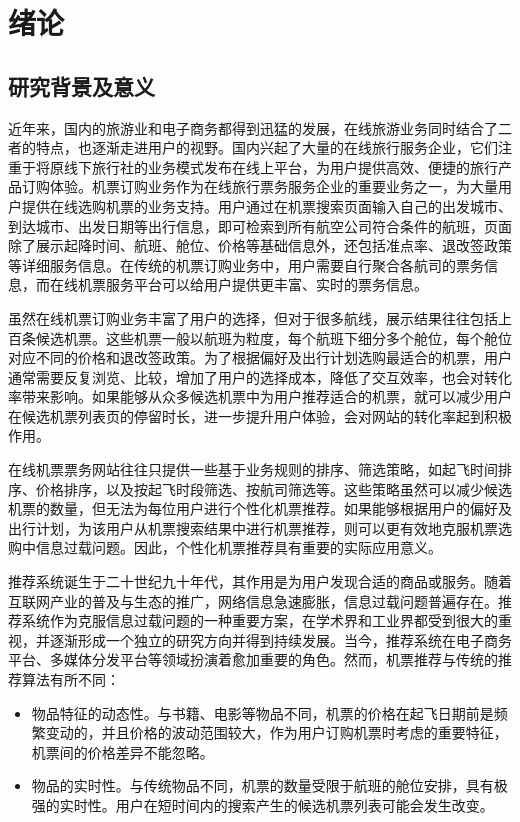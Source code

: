 
\chapter{绪论 }
\label{chap:intro}


\section{研究背景及意义}
近年来，国内的旅游业和电子商务都得到迅猛的发展，在线旅游业务同时结合了二者的特点，也逐渐走进用户的视野。国内兴起了大量的在线旅行服务企业，它们注重于将原线下旅行社的业务模式发布在线上平台，为用户提供高效、便捷的旅行产品订购体验。机票订购业务作为在线旅行票务服务企业的重要业务之一，为大量用户提供在线选购机票的业务支持。用户通过在机票搜索页面输入自己的出发城市、到达城市、出发日期等出行信息，即可检索到所有航空公司符合条件的航班，页面除了展示起降时间、航班、舱位、价格等基础信息外，还包括准点率、退改签政策等详细服务信息。在传统的机票订购业务中，用户需要自行聚合各航司的票务信息，而在线机票服务平台可以给用户提供更丰富、实时的票务信息。

虽然在线机票订购业务丰富了用户的选择，但对于很多航线，展示结果往往包括上百条候选机票。这些机票一般以航班为粒度，每个航班下细分多个舱位，每个舱位对应不同的价格和退改签政策。为了根据偏好及出行计划选购最适合的机票，用户通常需要反复浏览、比较，增加了用户的选择成本，降低了交互效率，也会对转化率带来影响。如果能够从众多候选机票中为用户推荐适合的机票，就可以减少用户在候选机票列表页的停留时长，进一步提升用户体验，会对网站的转化率起到积极作用。

在线机票票务网站往往只提供一些基于业务规则的排序、筛选策略，如起飞时间排序、价格排序，以及按起飞时段筛选、按航司筛选等。这些策略虽然可以减少候选机票的数量，但无法为每位用户进行个性化机票推荐。如果能够根据用户的偏好及出行计划，为该用户从机票搜索结果中进行机票推荐，则可以更有效地克服机票选购中信息过载问题。因此，个性化机票推荐具有重要的实际应用意义。

推荐系统诞生于二十世纪九十年代，其作用是为用户发现合适的商品或服务\cite{sivapalan2014recommender,adomavicius2005toward}。随着互联网产业的普及与生态的推广，网络信息急速膨胀，信息过载问题普遍存在。推荐系统作为克服信息过载问题的一种重要方案，在学术界和工业界都受到很大的重视，并逐渐形成一个独立的研究方向并得到持续发展。当今，推荐系统在电子商务平台、多媒体分发平台等领域扮演着愈加重要的角色。然而，机票推荐与传统的推荐算法有所不同：

\begin{itemize}
  \item 物品特征的动态性。与书籍、电影等物品不同，机票的价格在起飞日期前是频繁变动的，并且价格的波动范围较大，作为用户订购机票时考虑的重要特征，机票间的价格差异不能忽略。
  \item 物品的实时性。与传统物品不同，机票的数量受限于航班的舱位安排，具有极强的实时性。用户在短时间内的搜索产生的候选机票列表可能会发生改变。
\end{itemize}

